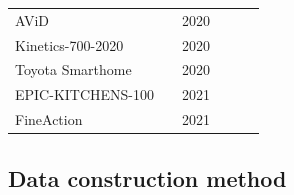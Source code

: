 \documentclass[a4paper]{article}
\begin{document}
\begin{table}[h]
\begin{tabular}{l|c|c|c c c}
		AViD                    & \cite{AViD}               & 2020 &              &           & \cmark         \\
		Kinetics-700-2020       & \cite{Kinetics-700-2020}  & 2020 &              &           & \cmark         \\
		Toyota Smarthome        & \cite{ToyotaSmarthome}    & 2020 & \cmark       &           & \cmark         \\
		EPIC-KITCHENS-100       & \cite{EPICKITCHENS100}    & 2021 & \cmark       &           & \cmark         \\	
		FineAction              & \cite{FineAction}         & 2021 & \cmark       &           &                \\
		\bottomrule
 		
	\end{tabular}%
	\label{characteristic}
\end{table}%

\subsection{Data construction method}
\end{document}
